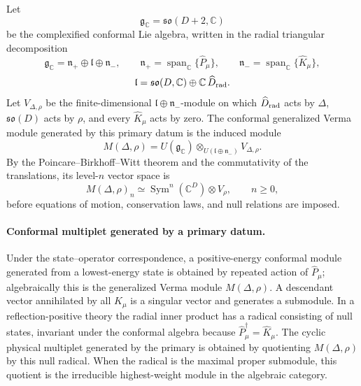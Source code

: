 \begin{definition}
\label{def:conformal-generalized-verma-module}
Let
\[
  \mathfrak g_{\mathbb C}
  =
  \mathfrak{so}(D+2,\mathbb C)
\]
be the complexified conformal Lie algebra, written in the radial triangular
decomposition
\[
  \mathfrak g_{\mathbb C}
  =
  \mathfrak n_+
  \oplus
  \mathfrak l
  \oplus
  \mathfrak n_-,
  \qquad
  \mathfrak n_+=\operatorname{span}_{\mathbb C}\{\widehat P_\mu\},
  \qquad
  \mathfrak n_-=\operatorname{span}_{\mathbb C}\{\widehat K_\mu\},
\]
\[
  \mathfrak l
  =
  \mathfrak{so}(D,\mathbb C)
  \oplus
  \mathbb C\,\widehat D_{\rm rad}.
\]
Let \(V_{\Delta,\rho}\) be the finite-dimensional
\(\mathfrak l\oplus\mathfrak n_-\)-module on which
\(\widehat D_{\rm rad}\) acts by \(\Delta\), \(\mathfrak{so}(D)\) acts by
\(\rho\), and every \(\widehat K_\mu\) acts by zero.  The conformal
generalized Verma module generated by this primary datum is the induced module
\begin{equation}
  M(\Delta,\rho)
  =
  U(\mathfrak g_{\mathbb C})
  \otimes_{U(\mathfrak l\oplus\mathfrak n_-)}
  V_{\Delta,\rho}.
  \label{eq:conformal-generalized-verma-module}
\end{equation}
By the Poincare--Birkhoff--Witt theorem and the commutativity of the
translations, its level-\(n\) vector space is
\begin{equation}
  M(\Delta,\rho)_n
  \simeq
  \operatorname{Sym}^n(\mathbb C^D)\otimes V_\rho,
  \qquad n\ge0,
  \label{eq:conformal-verma-levels}
\end{equation}
before equations of motion, conservation laws, and null relations are imposed.
\end{definition}

\paragraph{Conformal multiplet generated by a primary datum.}
Under the state--operator correspondence, a positive-energy conformal module
generated from a lowest-energy state is obtained by repeated action of
\(\widehat P_\mu\); algebraically this is the generalized Verma module
\(M(\Delta,\rho)\).  A descendant vector annihilated by all
\(\widehat K_\mu\) is a singular vector and generates a submodule.  In a
reflection-positive theory the radial inner product has a radical consisting
of null states, invariant under the conformal algebra because
\(\widehat P_\mu^\dagger=\widehat K_\mu\).  The cyclic physical multiplet
generated by the primary is obtained by quotienting \(M(\Delta,\rho)\) by this
null radical.  When the radical is the maximal proper submodule, this quotient
is the irreducible highest-weight module in the algebraic category.

